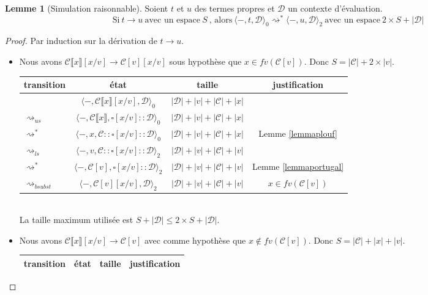 \documentclass[11pt,a4paper]{article}
\theoremstyle{definition}
\newtheorem{lemma}[theorem]{Lemme}
\newcommand{\etat}[1]{\langle #1 \rangle}
\newcommand{\etatz}[1]{\langle #1 \rangle_0}
\newcommand{\etatd}[1]{\langle #1 \rangle_2}
\newcommand{\mtd}{\mathcal{D}}
\newcommand{\mtc}{\mathcal{C}}
\begin{document}
\begin{lemma}[Simulation raisonnable]
  Soient $t$ et $u$ des termes propres et $\mtd$ un contexte d'évaluation.
  \[
    \text{Si}~t \rightarrow u~\text{avec un espace}~S~\text{, alors}~\etat{-,t,\mtd}_0 \rightsquigarrow^* \etat{-,u,\mtd}_2~\text{avec un espace}~2\times S+|\mtd|
  \]
\end{lemma}
\begin{proof}
  Par induction sur la dérivation de $t\rightarrow u$.
  \begin{itemize}
    \item {} Nous avons $\mtc\llbracket x\rrbracket[x/v]\rightarrow \mtc[v][x/v]$ sous hypothèse que $x\in fv(\mtc[v])$. Donc $S = |\mtc|+2\times|v|$.\\
      \begin{tabular}{@{}l c c c@{}}
        \toprule
        transition & état & taille & justification\\
        \midrule
                   & $\etatz{-,\mtc\llbracket x\rrbracket[x/v],\mtd}$ & $|\mtd|+|v|+|\mtc|+|x|$\\
        $\rightsquigarrow_{us}$ & $ \etatz{-, \mtc\llbracket x \rrbracket, \square[x/v]::\mtd}$ & $|\mtd| + |v| + |\mtc|+|x|$\\ 
        $\rightsquigarrow^*$ & $ \etatz{-, x ,\mtc:: \square[x/v]::\mtd}$ & $|\mtd| + |v| + |\mtc|+|x|$& Lemme \ref{lemmaplouf}\\
        $\rightsquigarrow_{ls}$ & $ \etatd{-, v ,\mtc:: \square[x/v]::\mtd}$ & $|\mtd| + |v| + |\mtc|+|v|$\\
        $\rightsquigarrow^*$ & $ \etatd{-, \mtc[v], \square[x/v]::\mtd}$ & $|\mtd| + |v| + |\mtc|+|v|$ &Lemme \ref{lemmaportugal}\\ 
        $\rightsquigarrow_{bsubst}$ & $ \etatd{-, \mtc[v][x/v], \mtd}$ & $|\mtd| + |v| + |\mtc|+|v|$&$x\in fv(\mtc[v])$\\ 
        \bottomrule
      \end{tabular}\\
      La taille maximum utilisée est $S +|\mtd| \le 2\times S +|\mtd|$.
    \item {} Nous avons $\mtc\llbracket x\rrbracket[x/v]\rightarrow \mtc[v]$ avec comme hypothèse que $x\notin fv(\mtc[v])$. Donc $S = |\mtc|+|x|+|v|$.\\
      \begin{tabular}{@{}l c c c@{}}
        \toprule
        transition & état & taille & justification\\
        \midrule

\end{tabular}
\end{itemize}
\end{proof}
\end{document}
